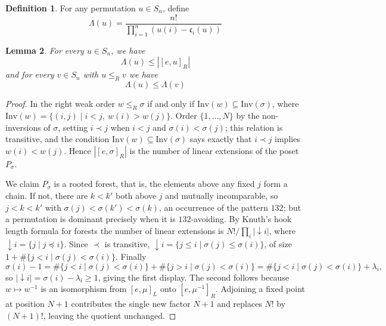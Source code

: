 \documentclass{amsart}
\newtheorem{lemma}{Lemma}[section]
\theoremstyle{definition}
\newtheorem{definition}[lemma]{Definition}
\theoremstyle{remark}
\numberwithin{equation}{section}
\newcommand{\code}{\mathfrak{c}}
\begin{document}
\begin{definition}
For any permutation $u\in S_n$, define
$$\Lambda(u) = \frac{n!}{\prod_{i=1}^n (u(i) - \code_i(u))}$$
\end{definition}

\begin{lemma} \label{lemma:dominantinterval}
For every $u\in S_n$, we have
$$\Lambda(u)\leq |[e, u]_R|$$
and for every $v\in S_n$ with $u\leq_R v$ we have
$$\Lambda(u)\leq\Lambda(v)$$
\end{lemma}
\begin{proof}
  In the right weak order $w\leq_R\sigma$ if and only if $\mathrm{Inv}(w)\subseteq\mathrm{Inv}(\sigma)$, where $\mathrm{Inv}(w)=\{(i,j)\mid i<j,\ w(i)>w(j)\}$. Order $\{1,\ldots,N\}$ by the non-inversions of $\sigma$, setting $i\prec j$ when $i<j$ and $\sigma(i)<\sigma(j)$; this relation is transitive, and the condition $\mathrm{Inv}(w)\subseteq\mathrm{Inv}(\sigma)$ says exactly that $i\prec j$ implies $w(i)<w(j)$. Hence $|[e,\sigma]_R|$ is the number of linear extensions of the poset $P_\sigma$.

We claim $P_\sigma$ is a rooted forest, that is, the elements above any fixed $j$ form a chain. If not, there are $k<k'$ both above $j$ and mutually incomparable, so $j<k<k'$ with $\sigma(j)<\sigma(k')<\sigma(k)$, an occurrence of the pattern $132$; but a permutation is dominant precisely when it is $132$-avoiding. By Knuth's hook length formula for forests the number of linear extensions is $N!\big/\prod_i|{\downarrow}i|$, where ${\downarrow}i=\{j\mid j\preceq i\}$. Since $\prec$ is transitive, ${\downarrow}i=\{j\leq i\mid\sigma(j)\leq\sigma(i)\}$, of size $1+\#\{j<i\mid\sigma(j)<\sigma(i)\}$. Finally
$$\sigma(i)-1=\#\{j<i\mid\sigma(j)<\sigma(i)\}+\#\{j>i\mid\sigma(j)<\sigma(i)\}=\#\{j<i\mid\sigma(j)<\sigma(i)\}+\lambda_i,$$
so $|{\downarrow}i|=\sigma(i)-\lambda_i\geq 1$, giving the first display. The second follows because $w\mapsto w^{-1}$ is an isomorphism from $[e,\mu]_L$ onto $[e,\mu^{-1}]_R$. Adjoining a fixed point at position $N+1$ contributes the single new factor $N+1$ and replaces $N!$ by $(N+1)!$, leaving the quotient unchanged.
\end{proof}
\end{document}
